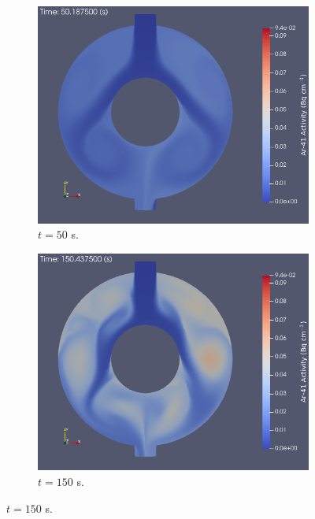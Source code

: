 \begin{figure}[H]
    \centering
    \begin{subfigure}[b]{0.495\textwidth}
        \centering
        \includegraphics[width=\textwidth]{images/demos/bwr_shield/ar41/ar41_50s.png}
        \caption{$t = 50$ s.}
        \label{fig:demo:bwr:ar41:50s}
    \end{subfigure}
    \hfill
    \begin{subfigure}[b]{0.495\textwidth}
        \centering
        \includegraphics[width=\textwidth]{images/demos/bwr_shield/ar41/ar41_150s.png}
        \caption{$t = 150$ s.}
        \label{fig:demo:bwr:ar41:150s}

\end{subfigure}
\end{figure}
